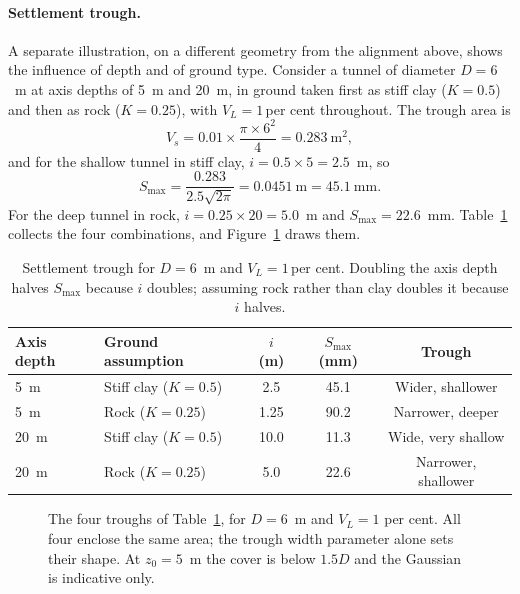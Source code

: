 \paragraph{Settlement trough.}
A separate illustration, on a different geometry from the alignment above,
shows the influence of depth and of ground type. Consider a tunnel of
diameter $D = 6$~m at axis depths of 5~m and 20~m, in
ground taken first as stiff clay ($K = 0.5$) and then as rock ($K = 0.25$),
with $V_L = 1$\,per cent throughout. The trough area is
\[
V_s = 0.01 \times \frac{\pi \times 6^2}{4} = 0.283\ \text{m}^2 ,
\]
and for the shallow tunnel in stiff clay, $i = 0.5 \times 5 = 2.5$~m, so
\[
S_{\max} = \frac{0.283}{2.5 \sqrt{2\pi}} = 0.0451\ \text{m} = 45.1\ \text{mm} .
\]
For the deep tunnel in rock, $i = 0.25 \times 20 = 5.0$~m and
$S_{\max} = 22.6$~mm. Table~\ref{tab:teaching_example} collects the four
combinations, and Figure~\ref{fig:trough-cases} draws them.

\begin{table}[htbp]
\caption{Settlement trough for $D = 6$~m and $V_L = 1$\,per cent. Doubling the
axis depth halves $S_{\max}$ because $i$ doubles; assuming rock rather
than clay doubles it because $i$ halves.}
\label{tab:teaching_example}
\centering
\small
\begin{tabular}{l l c c c}
\toprule
\textbf{Axis depth} & \textbf{Ground assumption} & $i$ (m) & $S_{\max}$ (mm) & \textbf{Trough} \\
\midrule
5~m & Stiff clay ($K=0.5$) & 2.5 & 45.1 & Wider, shallower \\
5~m & Rock ($K=0.25$) & 1.25 & 90.2 & Narrower, deeper \\
20~m & Stiff clay ($K=0.5$) & 10.0 & 11.3 & Wide, very shallow \\
20~m & Rock ($K=0.25$) & 5.0 & 22.6 & Narrower, shallower \\
\bottomrule
\end{tabular}
\end{table}

\begin{figure}[htbp]
\centering
{}
\caption{The four troughs of Table~\ref{tab:teaching_example}, for $D = 6$~m and $V_L = 1$ per cent. All four enclose the same area; the trough width parameter alone sets their shape. At $z_0 = 5$~m the cover is below $1.5D$ and the Gaussian is indicative only.}
\label{fig:trough-cases}
\end{figure}

